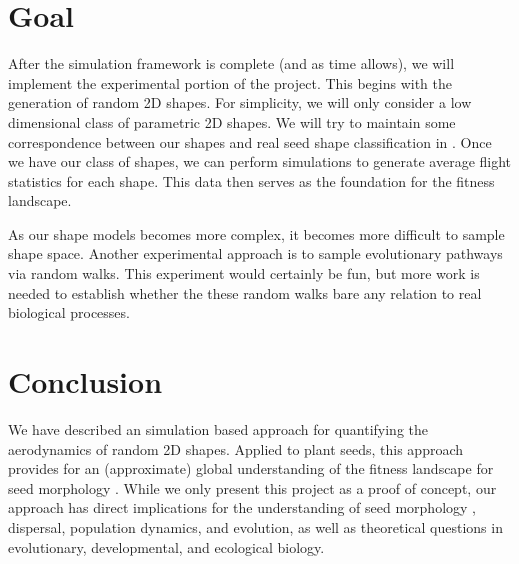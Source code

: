 \documentclass[annual]{acmsiggraph}
\begin{document}
\section{Goal}
After the simulation framework is complete (and as time allows), we will implement the experimental portion of the project.  This begins with the generation of random 2D shapes.  For simplicity, we will only consider a low dimensional class of parametric  2D shapes.   We will try to maintain some correspondence between our shapes and real seed shape classification in \cite{augspurger1986}.   Once we have our class of shapes, we can perform simulations to generate average flight statistics for each shape.  This data then serves as the foundation for the fitness landscape. 

As our shape models becomes more complex, it becomes more difficult to sample shape space.  Another experimental approach is to sample evolutionary pathways via random walks.   This experiment would certainly be fun, but more work is needed to establish  whether the these random walks bare any relation to real biological processes.  

\section{Conclusion}
We have described an simulation based approach  for quantifying the aerodynamics of random 2D shapes.  Applied to plant seeds, this approach provides for an (approximate) global understanding of the fitness landscape for seed morphology .  While we only present this project as a proof of concept, our approach has direct implications for the understanding of seed morphology , dispersal, population dynamics, and evolution,  as well as theoretical questions in evolutionary, developmental, and ecological biology.  




\end{document}
